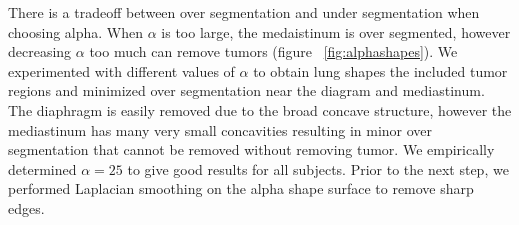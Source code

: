 \documentclass{llncs}
\begin{document}
There is a tradeoff between over segmentation and under segmentation when choosing alpha. When $\alpha$ is too large, the medaistinum is over segmented, however decreasing $\alpha$ too much can remove tumors (figure ~\ref{fig:alphashapes}).  We experimented with different values of $\alpha$ to obtain lung shapes the included tumor regions and minimized over segmentation near the diagram and mediastinum. The diaphragm is easily removed due to the broad concave structure, however the mediastinum has many very small concavities resulting in minor over segmentation that cannot be removed without removing tumor. We empirically determined $ \alpha=25 $ to give good results for all subjects. Prior to the next step, we performed Laplacian smoothing on the alpha shape surface to remove sharp edges. 

%
%
\end{document}
